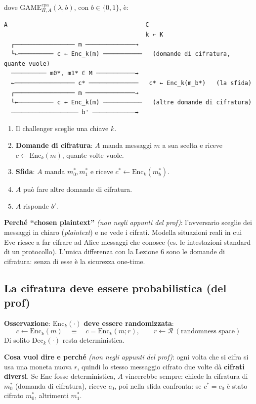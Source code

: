 dove \(\text{GAME}^{\text{cpa}}_{\Pi, A}(\lambda, b)\), con \(b \in \{0, 1\}\), è:

\begin{verbatim}
A                                       C
                                        k ← K
  ┌───────────────── m ──────────────→
  └←────────── c ← Enc_k(m) ───────────   (domande di cifratura, quante vuole)
  ────────── m0*, m1* ∈ M ───────────→
  ←───────────────── c* ──────────────   c* ← Enc_k(m_b*)   (la sfida)
  ┌───────────────── m ──────────────→
  └←────────── c ← Enc_k(m) ───────────   (altre domande di cifratura)
  ─────────────────── b' ────────────→
\end{verbatim}

\begin{enumerate}
  \item Il challenger sceglie una chiave \(k\).
  \item \textbf{Domande di cifratura}: \(A\) manda messaggi \(m\) a sua scelta e riceve \(c \leftarrow \text{Enc}_k(m)\), quante volte vuole.
  \item \textbf{Sfida}: \(A\) manda \(m_0^*, m_1^*\) e riceve \(c^* \leftarrow \text{Enc}_k(m_b^*)\).
  \item \(A\) può fare altre domande di cifratura.
  \item \(A\) risponde \(b'\).
\end{enumerate}

\begin{nota}
\textbf{Perché ``chosen plaintext''} \emph{(non negli appunti del prof)}: l'avversario sceglie dei messaggi in chiaro (\emph{plaintext}) e ne vede i cifrati. Modella situazioni reali in cui Eve riesce a far cifrare ad Alice messaggi che conosce (es. le intestazioni standard di un protocollo). L'unica differenza con la Lezione 6 sono le domande di cifratura: senza di esse è la sicurezza one-time.
\end{nota}

\subsection{La cifratura deve essere probabilistica (del prof)}

\textbf{Osservazione}: \(\text{Enc}_k(\cdot)\) \textbf{deve essere randomizzata}:
\[
c \leftarrow \text{Enc}_k(m) \quad \equiv \quad c = \text{Enc}_k(m; r), \qquad r \leftarrow \mathcal{R} \ (\text{randomness space})
\]
Di solito \(\text{Dec}_k(\cdot)\) resta deterministica.

\begin{nota}
\textbf{Cosa vuol dire e perché} \emph{(non negli appunti del prof)}: ogni volta che si cifra si usa una moneta nuova \(r\), quindi lo stesso messaggio cifrato due volte dà \textbf{cifrati diversi}. Se Enc fosse deterministica, \(A\) vincerebbe sempre: chiede la cifratura di \(m_0^*\) (domanda di cifratura), riceve \(c_0\), poi nella sfida confronta: se \(c^* = c_0\) è stato cifrato \(m_0^*\), altrimenti \(m_1^*\).
\end{nota}

